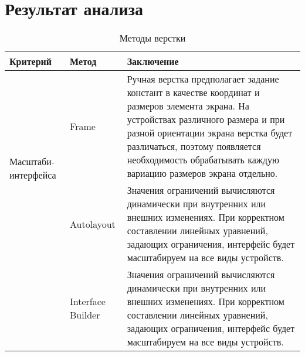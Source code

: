 \chapter{Результат анализа}

\begin{table}[H]
	\centering
	\caption{Методы верстки}
	\label{mko_table_0}
	\begin{tabular}{|p{2.9cm}|p{2.9cm}|p{9.5cm}|}
		\hline
		\textbf{Критерий} & \textbf{Метод} & \textbf{Заключение} \\
		\hline
		\multirow{2}{2.9cm}{Масштаби- интерфейса} & 
		Frame & 
		Ручная верстка предполагает задание констант в качестве координат и размеров элемента экрана.
		На устройствах различного размера и при разной ориентации экрана верстка будет различаться, 
		поэтому появляется необходимость обрабатывать каждую вариацию размеров экрана отдельно.\\
		\cline{2-3} & Autolayout & 
		Значения ограничений вычисляются динамически при внутренних или внешних изменениях. 
		При корректном составлении линейных уравнений, задающих ограничения, интерфейс будет масштабируем на все виды устройств. \\
		\cline{2-3} & Interface Builder & 
		Значения ограничений вычисляются динамически при внутренних или внешних изменениях. 
		При корректном составлении линейных уравнений, задающих ограничения, интерфейс будет масштабируем на все виды устройств. \\
		\hline
	\end{tabular}
\end{table}

\newpage

